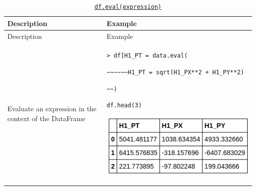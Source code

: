 \documentclass[10pt,a4paperpaper,]{article}
\begin{document}
\begin{longtable}[]{@{}ll@{}}
\caption{\href{http://pandas.pydata.org/pandas-docs/stable/generated/pandas.DataFrame.eval.html}{\texttt{df.eval(expression)}}}\tabularnewline
\toprule
\begin{minipage}[b]{0.47\columnwidth}\raggedright\strut
Description\strut
\end{minipage} & \begin{minipage}[b]{0.47\columnwidth}\raggedright\strut
Example\strut
\end{minipage}\tabularnewline
\midrule
\endfirsthead
\toprule
\begin{minipage}[b]{0.47\columnwidth}\raggedright\strut
Description\strut
\end{minipage} & \begin{minipage}[b]{0.47\columnwidth}\raggedright\strut
Example\strut
\end{minipage}\tabularnewline
\midrule
\endhead
\begin{minipage}[t]{0.47\columnwidth}\raggedright\strut
Evaluate an expression in the context of the DataFrame\strut
\end{minipage} & \begin{minipage}[t]{0.47\columnwidth}\raggedright\strut
\texttt{\textgreater{}\ df{[}\textquotesingle{}H1\_PT\textquotesingle{}{]}\ =\ data.eval(}

\texttt{\textasciitilde{}\textasciitilde{}\textasciitilde{}\textasciitilde{}\textasciitilde{}\textasciitilde{}\textquotesingle{}H1\_PT\ =\ sqrt(H1\_PX**2\ +\ H1\_PY**2)\textquotesingle{}}

\texttt{\textasciitilde{}\textasciitilde{})}

\texttt{df.head(3)}

\includegraphics[width=\textwidth]{assets/05-eval.png}\strut
\end{minipage}\tabularnewline
\bottomrule
\end{longtable}
\end{document}
